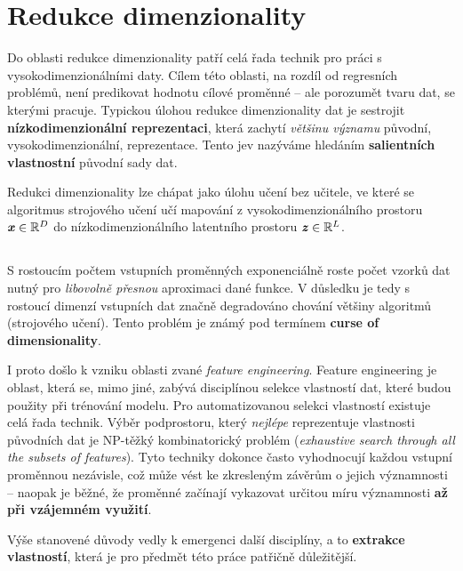 \section{Redukce dimenzionality}
\label{sec:dimensionality_reduction}

Do oblasti redukce dimenzionality patří celá řada technik pro práci s vysokodimenzionálními daty.
Cílem této oblasti, na rozdíl od regresních problémů, není predikovat hodnotu cílové proměnné – ale porozumět tvaru dat, se kterými pracuje.
Typickou úlohou redukce dimenzionality dat je sestrojit \textbf{nízkodimenzionální reprezentaci}, která zachytí \emph{většinu významu} původní, vysokodimenzionální, reprezentace.
Tento jev nazýváme hledáním \textbf{salientních vlastnostní} původní sady dat. \cite{Phillips2021}

Redukci dimenzionality lze chápat jako úlohu učení bez učitele, ve které se algoritmus strojového učení učí mapování z vysokodimenzionálního prostoru $\textbf{\emph{x}} \in \mathbb{R}^D$ do nízkodimenzionálního latentního prostoru $\textbf{\emph{z}} \in \mathbb{R}^L$. \cite{Murphy2022}

\subsection{}
S rostoucím počtem vstupních proměnných exponenciálně roste počet vzorků dat nutný pro \emph{libovolně přesnou} aproximaci dané funkce.
V důsledku je tedy s rostoucí dimenzí vstupních dat značně degradováno chování většiny algoritmů (strojového učení).
Tento problém je známý pod termínem \textbf{curse of dimensionality}. \cite{Bellman1957}

I proto došlo k vzniku oblasti zvané \emph{feature engineering}.
Feature engineering je oblast, která se, mimo jiné, zabývá disciplínou selekce vlastností dat, které budou použity při trénování modelu.
Pro automatizovanou selekci vlastností existuje celá řada technik.
Výběr podprostoru, který \emph{nejlépe} reprezentuje vlastnosti původních dat je NP-těžký kombinatorický problém (\emph{exhaustive search through all the subsets of features}).
Tyto techniky dokonce často vyhodnocují každou vstupní proměnnou nezávisle, což může vést ke zkresleným závěrům o jejich významnosti – naopak je běžné, že proměnné začínají vykazovat určitou míru významnosti \textbf{až při vzájemném využití}. \cite{Stanczyk2015}

Výše stanovené důvody vedly k emergenci další disciplíny, a to \textbf{extrakce vlastností}, která je pro předmět této práce patřičně důležitější.

